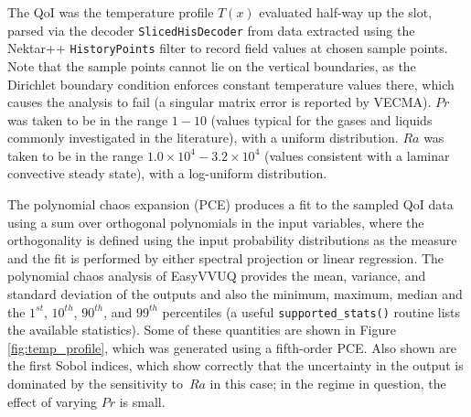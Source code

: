 The QoI was the temperature profile $T(x)$ evaluated half-way up the slot, parsed via the decoder \texttt{SlicedHisDecoder} from data extracted using the Nektar++ \texttt{HistoryPoints} filter to record field values at chosen sample points.  %
Note that the sample points cannot lie on the vertical boundaries, as the Dirichlet boundary condition enforces constant temperature values there, which causes the analysis to fail (a singular matrix error is reported by VECMA).  
$Pr$ was taken to be in the range $1-10$ (values typical for the gases and liquids commonly investigated in the literature), with a uniform distribution.  
$Ra$ was taken to be in the range $1.0\times 10^4 - 3.2 \times 10^4$ (values consistent with a laminar convective steady state), with a log-uniform distribution.

The polynomial chaos expansion (PCE) produces a fit to the sampled QoI data using a sum over orthogonal polynomials in the input variables, where the orthogonality is defined using the input probability distributions as the measure and the fit is performed by either spectral projection or linear regression.  
The polynomial chaos analysis of EasyVVUQ provides the mean, variance, and standard deviation of the outputs and also the minimum, maximum, median and the $1^{st}$, $10^{th}$, $90^{th}$, and $99^{th}$ percentiles (a useful \texttt{supported\_stats()} routine lists the available statistics).  
Some of these quantities are shown in Figure \ref{fig:temp_profile}, which was generated using a fifth-order PCE.  
Also shown are the first Sobol indices, which show correctly that the uncertainty in the output is dominated by the sensitivity to~$Ra$ in this case; in the regime in question, the effect of varying $Pr$ is small.

